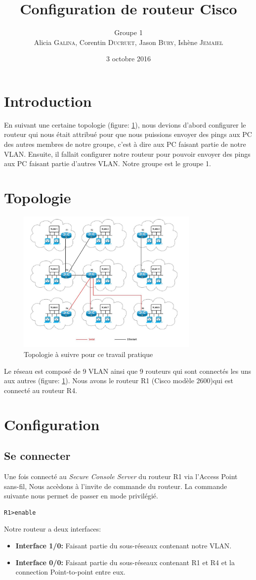 \documentclass[a4paper,10pt]{article}
\title{Configuration de routeur Cisco}
\author{Groupe 1\\Alicia \textsc{Galina}, Corentin \textsc{Ducruet}, Jason \textsc{Bury}, Ishène \textsc{Jemaiel}}
\date{3 octobre 2016}
\begin{document}
\maketitle

\section{Introduction}
En suivant une certaine topologie (figure: \ref{fig:topo}),
nous devions d'abord configurer le routeur qui nous était attribué pour que nous puissions envoyer des pings aux PC des autres membres de notre groupe,
c'est à dire aux PC faisant partie de notre VLAN.
Ensuite, il fallait configurer notre routeur pour pouvoir envoyer des pings aux PC faisant partie d'autres VLAN.
Notre groupe est le groupe 1.

\section{Topologie}
\begin{figure}[!h]
 \centering
 \includegraphics[height=7cm]{topo.jpg}
 \caption{Topologie à suivre pour ce travail pratique}
 \label{fig:topo}
\end{figure}%
Le réseau est composé de 9 VLAN ainsi que 9 routeurs qui sont connectés les uns aux autres (figure: \ref{fig:topo}). Nous avons le routeur R1 (Cisco modèle 2600)qui est connecté au routeur R4.

\section{Configuration}
\subsection{Se connecter}
Une fois connecté au \textit{Secure Console Server} du routeur R1 via l'Access Point sans-fil, Nous accèdons à l'invite de commande du routeur.
La commande suivante nous permet de passer en mode privilégié.
\begin{verbatim}
R1>enable
\end{verbatim}
Notre routeur a deux interfaces:
\begin{itemize}
 \item \textbf{Interface 1/0:} Faisant partie du sous-réseaux contenant notre VLAN.
 \item \textbf{Interface 0/0:} Faisant partie du sous-réseaux contenant R1 et R4 et la connection Point-to-point entre eux.
\end{itemize}
\end{document}
